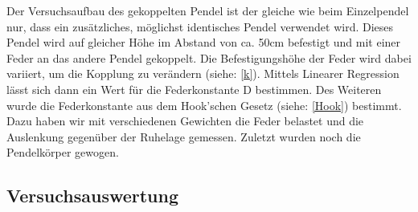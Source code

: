 \documentclass[12pt,a4paper]{article}
\begin{document}
Der Versuchsaufbau des gekoppelten Pendel ist der gleiche wie beim Einzelpendel nur, dass ein zusätzliches, möglichst identisches Pendel verwendet wird. Dieses Pendel wird auf gleicher Höhe im Abstand von ca. 50cm befestigt und mit einer Feder an das andere Pendel gekoppelt. Die Befestigungshöhe der Feder wird dabei variiert, um die Kopplung zu verändern (siehe: \ref{k}). Mittels Linearer Regression lässt sich dann ein Wert für die Federkonstante D bestimmen. \newline
Des Weiteren wurde die Federkonstante aus dem Hook'schen Gesetz (siehe: \ref{Hook}) bestimmt. Dazu haben wir mit verschiedenen Gewichten die Feder belastet und die Auslenkung gegenüber der Ruhelage gemessen.
Zuletzt wurden noch die Pendelkörper gewogen.
\subsection{Versuchsauswertung}
\end{document}
